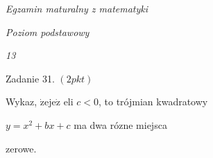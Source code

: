 \documentclass[a4paper,12pt]{article}
\begin{document}
{\it Egzamin maturalny z matematyki}

{\it Poziom podstawowy}

{\it 13}

Zadanie 31. $(2pkt)$

Wykaz, $\dot{\mathrm{z}}\mathrm{e}\mathrm{j}\mathrm{e}\dot{\mathrm{z}}$ eli $c<0$, to trójmian kwadratowy

$y=x^{2}+bx+c$ ma dwa rózne miejsca

zerowe.
\end{document}
